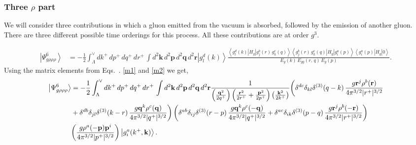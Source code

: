 \documentclass[aps,prd,amsmath,amssymb,nofootinbib]{revtex4-2}
\numberwithin{equation}{section}
\begin{document}
\subsubsection{Three $\rho$ part}
We will consider three contributions in which a gluon emitted from the vacuum is absorbed, followed by the emission of another gluon. There are three different possible time orderings for this process. All these contributions are at order $g^{3}$. 
\begin{figure}[h]
    \label{fig:1}
\end{figure}
\begin{figure}[h]
    \label{fig:2} 
\end{figure}
\begin{align}\label{3rho}
 \left|\Psi_{g\rho\rho\rho}^{6}\right\rangle  & = -\frac{1}{2}\int_{\Lambda}^{\vee}dk^{+}\, dp^{+}\, dq^{+}\, dr^{+}\,\int d^{2}\mathbf{k}\, d^{2}\mathbf{p}\, d^{2}\mathbf{q}\, d^{2}\mathbf{r}\left|g_{l}^{d}(k)\right\rangle \frac{\left\langle g_{l}^{d}(k)\left|H_{g}\right|g_{j}^{b}(r)\, g_{k}^{c}(q)\right\rangle \left\langle g_{j}^{b}(r)\, g_{k}^{c}(q)\left|H_{g}\right|g_{i}^{a}(p)\right\rangle \left\langle g_{i}^{a}(p)\left|H_{g}\right|0\right\rangle }{E_{g}(k)\, E_{gg}(r,\, q)\, E_{g}(p)}.
\end{align}
Using the matrix elements from Eqs.~. \eqref{m1} and \eqref{m2} we get,
\begin{align}\label{stseve}
\left|\Psi_{g\rho\rho\rho}^{6}\right\rangle & =-\frac{1}{2}\int_{\Lambda}^{\vee}dk^{+}\, dp^{+}\, dq^{+}\, dr^{+}\,\int d^{2}\mathbf{k}\, d^{2}\mathbf{p}\, d^{2}\mathbf{q}\, d^{2}\mathbf{r}\frac{1}{\left(\frac{\mathbf{q}^{2}}{2q^{+}}\right)\left(\frac{\mathbf{r}^{2}}{2r^{+}}+\frac{\mathbf{p}^{2}}{2p^{+}}\right)\left(\frac{\mathbf{k}^{2}}{2k^{+}}\right)}\bigg(\delta^{dc}\delta_{kl}\delta^{(3)}(q-k)\,\frac{g\mathbf{r}^{j}\rho^{b}(\mathbf{r})}{4\pi^{3/2}|r^{+}|^{3/2}}\notag \\ & +\delta^{db}\delta_{jl}\delta^{(3)}(k-r)\,\frac{g\mathbf{q}^{k}\rho^{c}(\mathbf{q})}{4\pi^{3/2}|q^{+}|^{3/2}}\bigg)\left(\delta^{ab}\delta_{ij}\delta^{(3)}(r-p)\,\frac{g\mathbf{q}^{k}\rho^{c}(-\mathbf{q})}{4\pi^{3/2}|q^{+}|^{3/2}}+\delta^{ac}\delta_{ik}\delta^{(3)}(p-q)\,\frac{g\mathbf{r}^{j}\rho^{b}(-\mathbf{r})}{4\pi^{3/2}|r^{+}|^{3/2}}\right)\notag \\ & \bigg(\frac{g\rho^{a}(-\mathbf{p})\mathbf{p}^{i}}{4\pi^{3/2}|p^{+}|^{3/2}}\bigg)\left|g_{i}^{a}(k^{+},\mathbf{k})\right\rangle.
\end{align}
\end{document}
